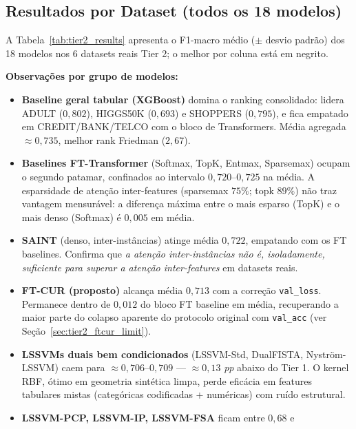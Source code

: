 \documentclass[12pt,a4paper]{article}
\begin{document}
\subsection{Resultados por Dataset (todos os 18 modelos)}

A Tabela~\ref{tab:tier2_results} apresenta o F1-macro médio ($\pm$ desvio
padrão) dos 18 modelos nos 6 datasets reais Tier 2; o melhor por coluna está
em negrito.



\textbf{Observações por grupo de modelos:}
\begin{itemize}
  \item \textbf{Baseline geral tabular (XGBoost)} domina o ranking
        consolidado: lidera ADULT (\(0{,}802\)), HIGGS50K (\(0{,}693\)) e
        SHOPPERS (\(0{,}795\)), e fica empatado em CREDIT/BANK/TELCO com o
        bloco de Transformers. Média agregada $\approx 0{,}735$, melhor
        rank Friedman (\(2{,}67\)).
  \item \textbf{Baselines FT-Transformer} (Softmax, TopK, Entmax, Sparsemax)
        ocupam o segundo patamar, confinados ao intervalo
        \(0{,}720\)--\(0{,}725\) na média. A esparsidade de atenção
        inter-features (sparsemax \(75\%\); topk \(89\%\)) não traz vantagem
        mensurável: a diferença máxima entre o mais esparso (TopK) e o mais
        denso (Softmax) é $0{,}005$ em média.
  \item \textbf{SAINT} (denso, inter-instâncias) atinge média \(0{,}722\),
        empatando com os FT baselines. Confirma que \emph{a atenção
        inter-instâncias não é, isoladamente, suficiente para superar a
        atenção inter-features} em datasets reais.
  \item \textbf{FT-CUR (proposto)} alcança média \(0{,}713\) com a correção
        \texttt{val\_loss}. Permanece dentro de $0{,}012$ do bloco FT baseline
        em média, recuperando a maior parte do colapso aparente do protocolo
        original com \texttt{val\_acc} (ver Seção~\ref{sec:tier2_ftcur_limit}).
  \item \textbf{LSSVMs duais bem condicionados} (LSSVM-Std, DualFISTA,
        Nyström-LSSVM) caem para $\approx 0{,}706$--$0{,}709$ ---
        $\approx 0{,}13$ \emph{pp} abaixo do Tier 1. O kernel RBF, ótimo em
        geometria sintética limpa, perde eficácia em features tabulares mistas
        (categóricas codificadas + numéricas) com ruído estrutural.
  \item \textbf{LSSVM-PCP, LSSVM-IP, LSSVM-FSA} ficam entre $0{,}68$ e

\end{itemize}
\end{document}
